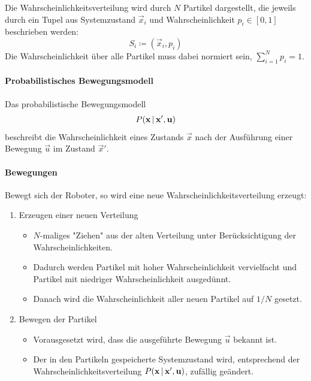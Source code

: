 				Die Wahrscheinlichkeitsverteilung wird durch \(N\) Partikel dargestellt, die jeweils durch ein Tupel aus Systemzustand \( \vec{x}_i \) und Wahrscheinlichkeit \( p_i \in [0, 1] \) beschrieben werden:
				\begin{equation*}
					S_i \coloneqq (\vec{x}_i, p_i)
				\end{equation*}
				Die Wahrscheinlichkeit über alle Partikel muss dabei normiert sein, \dh \( \sum_{i = 1}^{N} p_i = 1 \).
				
				\paragraph{Probabilistisches Bewegungsmodell}
					Das probabilistische Bewegungsmodell
					\begin{equation*}
						P(\boldsymbol{\mathrm{x}} \,\vert\, \boldsymbol{\mathrm{x}}', \boldsymbol{\mathrm{u}})
					\end{equation*}
					beschreibt die Wahrscheinlichkeit eines Zustands \( \vec{x} \) nach der Ausführung einer Bewegung \( \vec{u} \) im Zustand \( \vec{x}' \).
				
				\paragraph{Bewegungen}
					Bewegt sich der Roboter, so wird eine neue Wahrscheinlichkeitsverteilung erzeugt:
					\begin{enumerate}
						\item Erzeugen einer neuen Verteilung
							\begin{itemize}
								\item \(N\)-maliges "Ziehen" aus der alten Verteilung unter Berücksichtigung der Wahrscheinlichkeiten.
								\item Dadurch werden Partikel mit hoher Wahrscheinlichkeit vervielfacht und Partikel mit niedriger Wahrscheinlichkeit ausgedünnt.
								\item Danach wird die Wahrscheinlichkeit aller neuen Partikel auf \( 1/N \) gesetzt.
							\end{itemize}
						\item Bewegen der Partikel
							\begin{itemize}
								\item Vorausgesetzt wird, dass die ausgeführte Bewegung \( \vec{u} \) bekannt ist.
								\item Der in den Partikeln gespeicherte Systemzustand wird, entsprechend der Wahrscheinlichkeitsverteilung \( P(\boldsymbol{\mathrm{x}} \,\vert\, \boldsymbol{\mathrm{x}}', \boldsymbol{\mathrm{u}}) \), zufällig geändert.
							\end{itemize}
					\end{enumerate}
				
